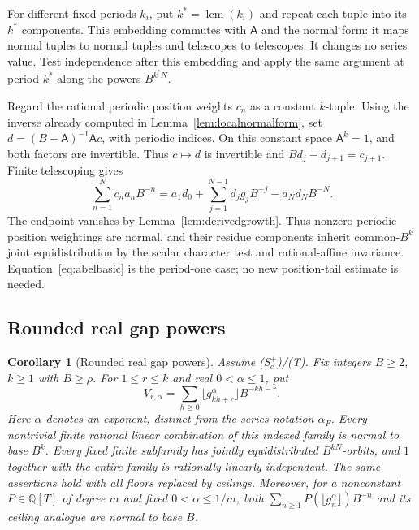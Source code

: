 \documentclass[11pt,a4paper]{article}
\newtheorem{corollary}[theorem]{Corollary}
\newcommand{\Q}{\mathbb Q}
\begin{document}
For different fixed periods $k_i$, put $k^*=\operatorname{lcm}(k_i)$
and repeat each tuple into its $k^*$ components. This embedding commutes with
$\mathsf A$ and the normal form: it maps normal
tuples to normal tuples and telescopes to telescopes. It changes no
series value. Test independence after this embedding and apply the
same argument at period $k^*$ along the powers $B^{k^*N}$.

Regard the rational periodic position weights $c_n$ as a constant
$k$-tuple. Using the inverse already computed in
Lemma~\ref{lem:localnormalform}, set
$d=(B-\mathsf A)^{-1}\mathsf Ac$, with periodic indices.
On this constant space $\mathsf A^k=1$, and both factors are
invertible. Thus $c\mapsto d$ is invertible and
$Bd_j-d_{j+1}=c_{j+1}$. Finite telescoping gives
\[
 \sum_{n=1}^N c_na_nB^{-n}
 =a_1d_0+\sum_{j=1}^{N-1}d_jg_jB^{-j}-a_Nd_NB^{-N}.
\]
The endpoint vanishes by Lemma~\ref{lem:derivedgrowth}. Thus nonzero
periodic position weightings are normal, and their residue components
inherit common-$B^k$ joint equidistribution by the scalar character
test and rational-affine invariance. Equation~\eqref{eq:abelbasic} is the
period-one case; no new position-tail estimate is needed.

\subsection{Rounded real gap powers}\label{sec:roundedpowers}

\begin{corollary}[Rounded real gap powers]\label{cor:roundedpowers}
Assume (S$^+_c$)/(T). Fix integers $B\ge2$, $k\ge1$
with $B\ge\rho$. For $1\le r\le k$ and real $0<\alpha\le1$, put
\[
 V_{r,\alpha}=\sum_{h\ge0}
       \lfloor g_{kh+r}^{\alpha}\rfloor B^{-kh-r}.
\]
Here $\alpha$ denotes an exponent, distinct from the series notation $\alpha_F$.
Every nontrivial finite rational linear combination of this indexed
family is normal to base $B^k$. Every fixed finite subfamily has jointly
equidistributed $B^{kN}$-orbits, and $1$ together with the entire
family is rationally linearly independent.
The same assertions hold with all floors replaced by ceilings.
Moreover, for a nonconstant $P\in\Q[T]$ of degree $m$ and fixed
$0<\alpha\le1/m$, both
$\sum_{n\ge1}P(\lfloor g_n^\alpha\rfloor)B^{-n}$ and its ceiling analogue
are normal to base $B$.
\end{corollary}
\end{document}
